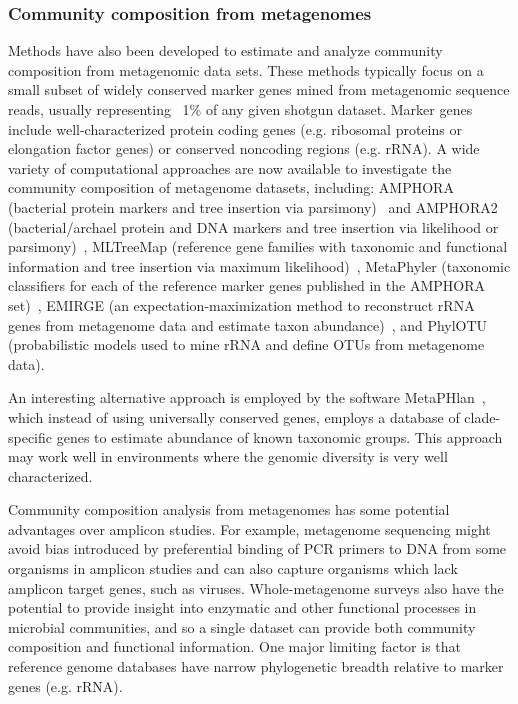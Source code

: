 \documentclass[10pt]{article}
\begin{document}
\subsubsection*{Community composition from metagenomes}

Methods have also been developed to estimate and analyze community composition from metagenomic data sets.
These methods typically focus on a small subset of widely conserved marker genes mined from metagenomic sequence reads, usually representing ~1\% of any given shotgun dataset. 
Marker genes include well-characterized protein coding genes (e.g. ribosomal proteins or elongation factor genes) or conserved noncoding regions (e.g. rRNA). 
A wide variety of computational approaches are now available to investigate the community composition of metagenome datasets, including: AMPHORA (bacterial protein markers and tree insertion via parsimony)~\cite{WuEisen2008} and AMPHORA2 (bacterial/archael protein and DNA markers and tree insertion via likelihood or parsimony)~\cite{Wu2012}, MLTreeMap (reference gene families with taxonomic and functional information and tree insertion via maximum likelihood)~\cite{Stark2010}, MetaPhyler (taxonomic classifiers for each of the reference marker genes published in the AMPHORA set)~\cite{Liu2010}, EMIRGE (an expectation-maximization method to reconstruct rRNA genes from metagenome data and estimate taxon abundance)~\cite{Miller2011}, and PhylOTU (probabilistic models used to mine rRNA and define OTUs from metagenome data)\cite{Sharpton2011}.

An interesting alternative approach is employed by the software MetaPHlan~\cite{Segata2012}, which instead of using universally conserved genes, employs a database of clade-specific genes to estimate abundance of known taxonomic groups. This approach may work well in environments where the genomic diversity is very well characterized.

Community composition analysis from metagenomes has some potential advantages over amplicon studies.
For example, metagenome sequencing might avoid bias introduced by preferential binding of PCR primers to DNA from some organisms in amplicon studies and can also capture organisms which lack amplicon target genes, such as viruses.
Whole-metagenome surveys also have the potential to provide insight into enzymatic and other functional processes in microbial communities, and so a single dataset can provide both community composition and functional information. 
One major limiting factor is that reference genome databases have narrow phylogenetic breadth relative to marker genes (e.g. rRNA). 
\end{document}
